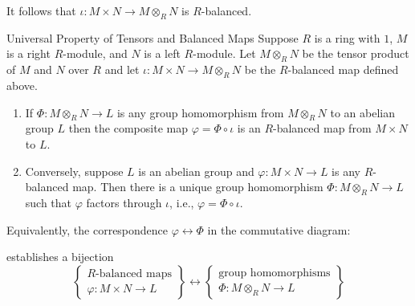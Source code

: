 \documentclass[12pt, a4paper, twoside, openright, titlepage]{book}
\begin{document}
It follows that $\iota:M\times N\rightarrow M\otimes_RN$ is $R$-balanced. 

\begin{thm}{Universal Property of Tensors and Balanced Maps}{}
    Suppose $R$ is a ring with $1$, $M$ is a right $R$-module, and $N$ is a left $R$-module. Let $M\otimes_RN$ be the tensor product of $M$ and $N$ over $R$ and let $\iota:M\times N\rightarrow M\otimes_RN$ be the $R$-balanced map defined above.
    \begin{enumerate}
        \item If $\Phi:M\otimes_RN\rightarrow L$ is any group homomorphism from $M\otimes_RN$ to an abelian group $L$ then the composite map $\varphi = \Phi\circ \iota$ is an $R$-balanced map from $M\times N$ to $L$.
        \item Conversely, suppose $L$ is an abelian group and $\varphi:M\times N\rightarrow L$ is any $R$-balanced map. Then there is a unique group homomorphism $\Phi:M\otimes_RN\rightarrow L$ such that $\varphi$ factors through $\iota$, i.e., $\varphi = \Phi \circ \iota$.
    \end{enumerate}
    Equivalently, the correspondence $\varphi \leftrightarrow \Phi$ in the commutative diagram:
    \begin{center}
    \end{center}
    establishes a bijection \begin{equation*}
        \left\{\begin{array}{c} R\text{-balanced maps} \\ \varphi:M\times N\rightarrow L\end{array}\right\}\leftrightarrow \left\{\begin{array}{c} \text{group homomorphisms} \\ \Phi:M\otimes_R N\rightarrow L\end{array}\right\}
    \end{equation*}
\end{thm}
\end{document}
